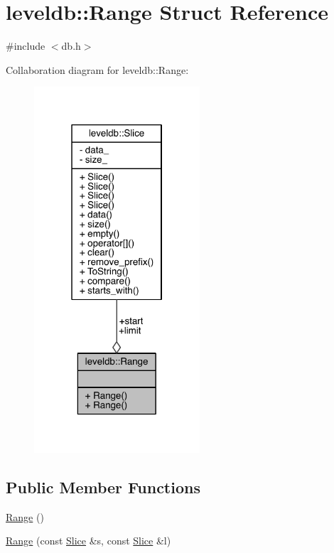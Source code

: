 \hypertarget{structleveldb_1_1_range}{}\section{leveldb\+:\+:Range Struct Reference}
\label{structleveldb_1_1_range}


{\ttfamily \#include $<$db.\+h$>$}



Collaboration diagram for leveldb\+:\+:Range\+:\nopagebreak
\begin{figure}[H]
\begin{center}
\leavevmode
\includegraphics[width=175pt]{structleveldb_1_1_range__coll__graph}
\end{center}
\end{figure}
\subsection*{Public Member Functions}
\begin{DoxyCompactItemize}
\item 
\hyperlink{structleveldb_1_1_range_af73eb85edfde053ebc456cb08f4d3ec1}{Range} ()
\item 
\hyperlink{structleveldb_1_1_range_a797d5e3b58cc615dfb805965d06bdcbf}{Range} (const \hyperlink{classleveldb_1_1_slice}{Slice} \&s, const \hyperlink{classleveldb_1_1_slice}{Slice} \&l)
\end{DoxyCompactItemize}
